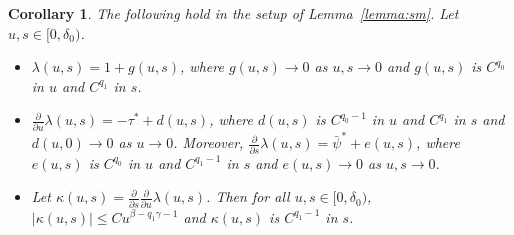 \documentclass[12pt]{article}
\numberwithin{equation}{section}
\newtheorem{cor}[thm]{Corollary}
{\theorembodyfont{\rmfamily}
\newtheorem{defn}[thm]{Definition}
\newtheorem{example}[thm]{Example}
\newtheorem{conj}[thm]{Conjecture}
\newtheorem{rmk}[thm]{Remark}
}
\begin{document}
\begin{cor}\label{cor:smev}The following hold in the setup of Lemma~\ref{lemma:sm}.  Let $u, s\in [0,\delta_0)$.
\begin{itemize}
 \item[(i)] $\lambda(u,s)=1+g(u,s)$, where $g(u,s)\to 0$ as $u,s\to 0$
 and $g(u,s)$ is $C^{q_0}$ in $u$ and $C^{q_1}$ in $s$.
 \item[(ii)] $\frac{\partial}{\partial u}\lambda(u,s)=-\tau^*+d(u,s)$, where $d(u,s)$ is $C^{q_0-1}$ in $u$ and $C^{q_1}$ in $s$
 and $d(u,0)\to 0$ as $u\to 0$.
 Moreover,
 $\frac{\partial}{\partial s}\lambda(u,s)=\bar\psi^*+e(u,s)$,
  where $e(u,s)$ is $C^{q_0}$ in $u$ and $C^{q_1-1}$ in $s$
  and $e(u,s)\to 0$ as $u,s\to 0$.
  
  \item[(iii)]Let
  $\kappa(u,s)=\frac{\partial}{\partial s}\frac{\partial}{\partial u}\lambda(u,s)$.
  Then for all $u,s\in [0,\delta_0)$,
  \(
  |\kappa(u,s)|\le C u^{\beta-q_1\gamma-1}   \)
   and $\kappa(u,s)$ is $C^{q_1-1}$ in $s$.
\end{itemize}
\end{cor}
\end{document}
